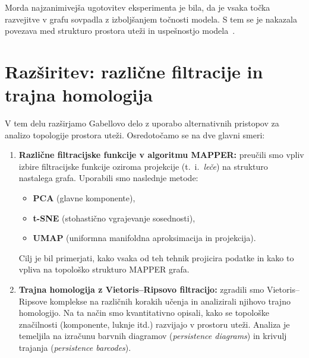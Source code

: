 Morda najzanimivejša ugotovitev eksperimenta je bila, da je vsaka točka razvejitve v grafu sovpadla z izboljšanjem točnosti modela. S tem se je nakazala povezava med strukturo prostora uteži in uspešnostjo modela~\cite{gabella2020}.

\section{Razširitev: različne filtracije in trajna homologija}

V tem delu razširjamo Gabellovo delo z uporabo alternativnih pristopov za analizo topologije prostora uteži. Osredotočamo se na dve glavni smeri:

\begin{enumerate}
    \item \textbf{Različne filtracijske funkcije v algoritmu MAPPER:} preučili smo vpliv izbire filtracijske funkcije oziroma projekcije (t.\ i.\ \emph{leče}) na strukturo nastalega grafa. Uporabili smo naslednje metode:
    \begin{itemize}
        \item \textbf{PCA} (glavne komponente),
        \item \textbf{t-SNE} (stohastično vgrajevanje sosednosti),
        \item \textbf{UMAP} (uniformna manifoldna aproksimacija in projekcija).
    \end{itemize}
    Cilj je bil primerjati, kako vsaka od teh tehnik projicira podatke in kako to vpliva na topološko strukturo MAPPER grafa.

    \item \textbf{Trajna homologija z Vietoris--Ripsovo filtracijo:} zgradili smo Vietoris--Ripsove komplekse na različnih korakih učenja in analizirali njihovo trajno homologijo. Na ta način smo kvantitativno opisali, kako se topološke značilnosti (komponente, luknje itd.) razvijajo v prostoru uteži. Analiza je temeljila na izračunu barvnih diagramov (\emph{persistence diagrams}) in krivulj trajanja (\emph{persistence barcodes}).
\end{enumerate}
